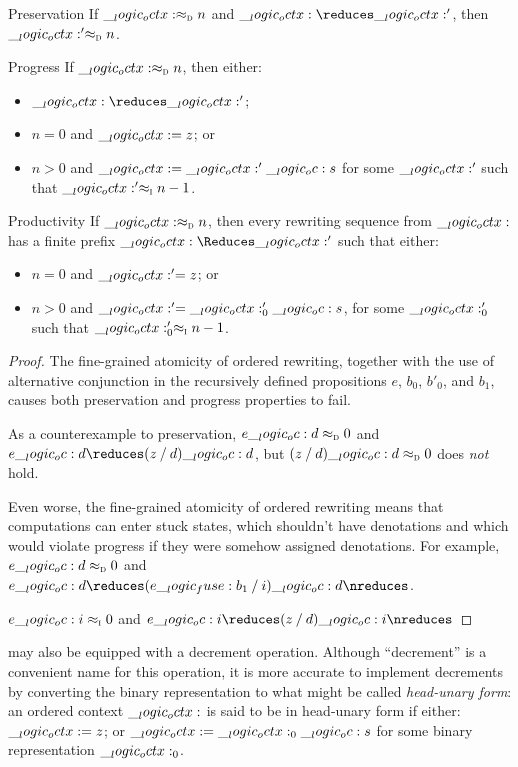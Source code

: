 \begin{falseclaim}\leavevmode
  \begin{thmdescription}
  \item[Preservation]
    If $\__logic_octx: \approx\sb{\text{\normalfont\scshape d}} n$ and $\octx \reduces \octx'$, then $\__logic_octx:' \approx\sb{\text{\normalfont\scshape d}} n$.
  \item[Progress]
    If $\__logic_octx: \approx\sb{\text{\normalfont\scshape d}} n$, then either:
    \begin{itemize}[nosep]
    \item $\octx \reduces \octx'$;
    \item $n = 0$ and $\__logic_octx: = z$; or
    \item $n > 0$ and $\__logic_octx: = \__logic_octx:' \__logic_oc: s$ for some $\__logic_octx:'$ such that $\__logic_octx:' \approx\sb{\text{\normalfont\scshape i}} n-1$.
    \end{itemize}
  \item[Productivity]
    If $\__logic_octx: \approx\sb{\text{\normalfont\scshape d}} n$, then every rewriting sequence from $\__logic_octx:$ has a finite prefix $\octx \Reduces \octx'$ such that either:
    \begin{itemize}[nosep]
    \item $n = 0$ and $\__logic_octx:' = z$; or
    \item $n > 0$ and $\__logic_octx:' = \__logic_octx:'_0 \__logic_oc: s$, for some $\__logic_octx:'_0$ such that $\__logic_octx:'_0 \approx\sb{\text{\normalfont\scshape i}} n-1$.
    \end{itemize}
  \end{thmdescription}
\end{falseclaim}
\begin{proof}
  The fine-grained atomicity of ordered rewriting, together with the use of alternative conjunction in the recursively defined propositions $e$, $b_0$, $b'_0$, and $b_1$, causes both preservation and progress properties to fail.

  As a counterexample to preservation, $e \__logic_oc: d \approx\sb{\text{\normalfont\scshape d}} 0$ and $e \oc d \reduces (z \pmir d) \oc d$, but $(z \mathbin { / } d) \__logic_oc: d \approx\sb{\text{\normalfont\scshape d}} 0$ does \emph{not} hold.

  Even worse, the fine-grained atomicity of ordered rewriting means that computations can enter stuck states, which shouldn't have denotations and which would violate progress if they were somehow assigned denotations.
  For example, $e \__logic_oc: d \approx\sb{\text{\normalfont\scshape d}} 0$ and $e \oc d \reduces (e \fuse b_1 \pmir i) \oc d \nreduces$.

  $e \__logic_oc: i \approx\sb{\text{\normalfont\scshape i}} 0$ and $e \oc i \reduces (z \pmir d) \oc i \nreduces$
\end{proof}


 may also be equipped with a decrement operation.
Although \enquote{decrement} is a convenient name for this operation, it is more accurate to implement decrements by converting the binary representation to what might be called \emph{head-unary form}: an ordered context $\__logic_octx:$ is said to be in head-unary form if either: $\__logic_octx: = z$; or $\__logic_octx: = \__logic_octx:_0 \__logic_oc: s$ for some binary representation $\__logic_octx:_0$.

